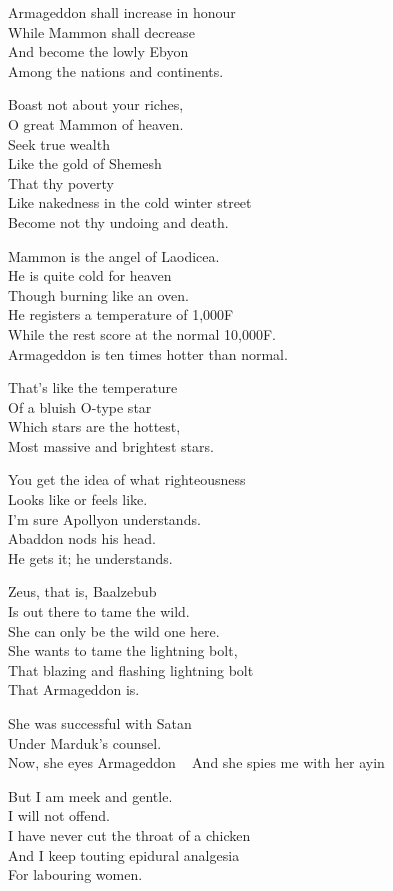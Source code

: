 \documentclass[
]{book}
\begin{document}
Armageddon shall increase in honour\\
While Mammon shall decrease\\
And become the lowly Ebyon\\
Among the nations and continents.

Boast not about your riches,\\
O great Mammon of heaven.\\
Seek true wealth\\
Like the gold of Shemesh\\
That thy poverty\\
Like nakedness in the cold winter street\\
Become not thy undoing and death.

Mammon is the angel of Laodicea.\\
He is quite cold for heaven\\
Though burning like an oven.\\
He registers a temperature of 1,000F\\
While the rest score at the normal 10,000F.\\
Armageddon is ten times hotter than normal.

That's like the temperature\\
Of a bluish O-type star\\
Which stars are the hottest,\\
Most massive and brightest stars.

You get the idea of what righteousness\\
Looks like or feels like.\\
I'm sure Apollyon understands.\\
Abaddon nods his head.\\
He gets it; he understands.

Zeus, that is, Baalzebub\\
Is out there to tame the wild.\\
She can only be the wild one here.\\
She wants to tame the lightning bolt,\\
That blazing and flashing lightning bolt\\
That Armageddon is.

She was successful with Satan\\
Under Marduk's counsel.\\
Now, she eyes Armageddon ~
And she spies me with her ayin

But I am meek and gentle.\\
I will not offend.\\
I have never cut the throat of a chicken\\
And I keep touting epidural analgesia\\
For labouring women.
\end{document}
